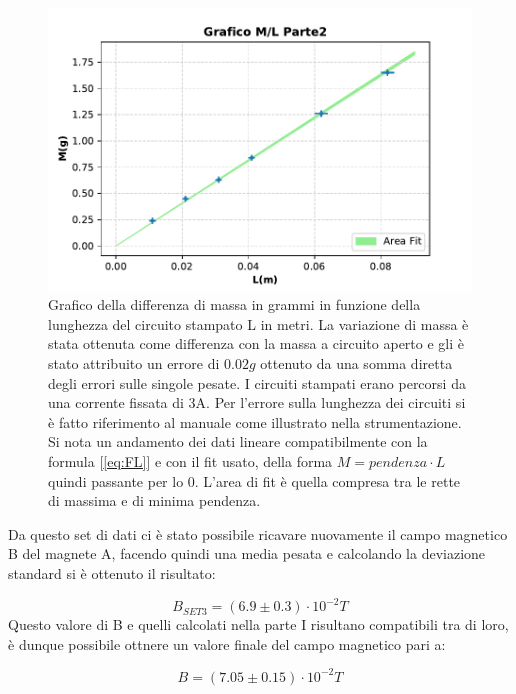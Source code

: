 {\fontsize{12}{18}\selectfont 

\begin{figure}[H]
  \centering
  \includegraphics[width=13.5cm]{Figures/GraficoMLParte2.pdf}
  \caption{Grafico della differenza di massa in grammi in funzione della lunghezza del circuito stampato L in metri. La variazione di massa è stata ottenuta come differenza con la massa a circuito aperto e gli è stato attribuito un errore di $0.02g$ ottenuto da una somma diretta degli errori sulle singole pesate. I circuiti stampati erano percorsi da una corrente fissata di 3A. Per l'errore sulla lunghezza dei circuiti si è fatto riferimento al manuale come illustrato nella strumentazione. Si nota un andamento dei dati lineare compatibilmente con la formula [\ref{eq:FL}] e con il fit usato, della forma $M = pendenza \cdot L$ quindi passante per lo 0. L'area di fit è quella compresa tra le rette di massima e di minima pendenza.}   
  \label{fig:GraficoParteII}
\end{figure}
Da questo set di dati ci è stato possibile ricavare nuovamente il campo magnetico B del magnete A, facendo quindi una media pesata e calcolando la deviazione standard si è ottenuto il risultato:

\par
\begin{equation*}
    B_{SET3} = (6.9 \pm 0.3)\cdot 10^{-2}T
\end{equation*}
Questo valore di B e quelli calcolati nella parte I risultano compatibili tra di loro, è dunque possibile ottnere un valore finale del campo magnetico pari a:

\begin{equation*}
    B = (7.05 \pm 0.15)\cdot 10^{-2}T 
\end{equation*}

\par}